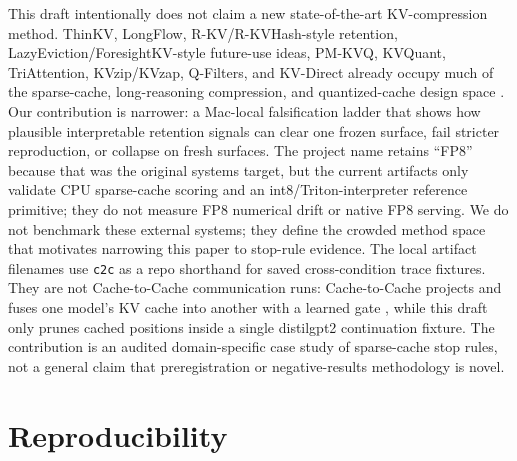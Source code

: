 \documentclass{article}
\begin{document}
This draft intentionally does not claim a new state-of-the-art KV-compression
method. ThinKV, LongFlow, R-KV/R-KVHash-style retention,
LazyEviction/ForesightKV-style future-use ideas, PM-KVQ, KVQuant,
TriAttention, KVzip/KVzap, Q-Filters, and KV-Direct already occupy much of the
sparse-cache, long-reasoning compression, and quantized-cache design space
\cite{thinkv,longflow,rkv,lazyeviction,foresightkv,pmkvq,kvquant,recentkvcache}.
Our
contribution is narrower: a Mac-local falsification ladder that shows how
plausible interpretable retention signals can clear one frozen surface, fail
stricter reproduction, or collapse on fresh surfaces. The project name retains
``FP8'' because that was the original systems target, but the current artifacts
only validate CPU sparse-cache scoring and an int8/Triton-interpreter reference
primitive; they do not measure FP8 numerical drift or native FP8 serving.
We do not benchmark these external systems; they define the crowded method
space that motivates narrowing this paper to stop-rule evidence.
The local artifact filenames use \texttt{c2c} as a repo shorthand for saved
cross-condition trace fixtures. They are not Cache-to-Cache communication runs:
Cache-to-Cache projects and fuses one model's KV cache into another with a
learned gate \cite{cachetocache}, while this draft only prunes cached positions
inside a single distilgpt2 continuation fixture.
The contribution is an audited domain-specific case study of sparse-cache stop
rules, not a general claim that preregistration or negative-results methodology
is novel.

\section{Reproducibility}
\end{document}
